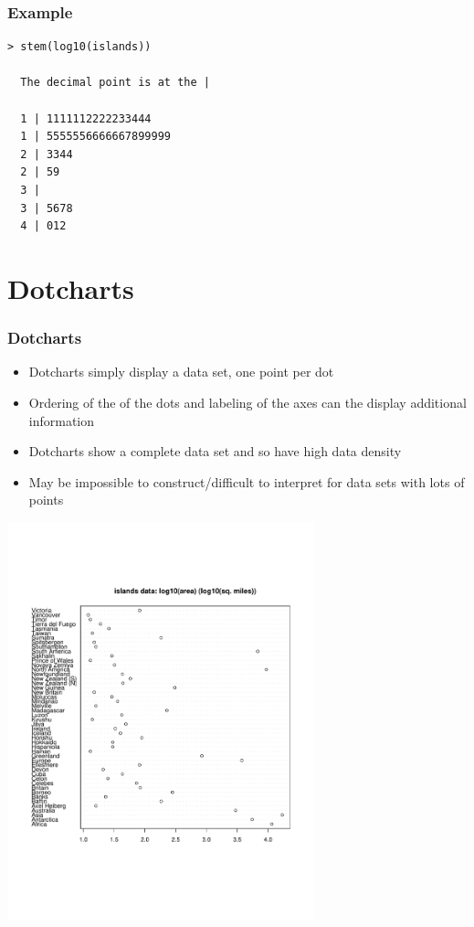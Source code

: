 \documentclass[aspectratio=169]{beamer}
\begin{document}
\begin{frame}[fragile]\frametitle{Example}
\begin{verbatim}
> stem(log10(islands))

  The decimal point is at the |

  1 | 1111112222233444
  1 | 5555556666667899999
  2 | 3344
  2 | 59
  3 | 
  3 | 5678
  4 | 012
\end{verbatim}
\end{frame}

\section{Dotcharts}
\begin{frame}\frametitle{Dotcharts}
\begin{itemize}
\item Dotcharts simply display a data set, one point per dot
\item Ordering of the of the dots and labeling of the axes
  can the display additional information
\item Dotcharts show a complete data set and so have high
  data density
\item May be impossible to construct/difficult to interpret
  for data sets with lots of points
\end{itemize}
\end{frame}

\begin{frame}
\includegraphics[width=3.5in]{dotChart.pdf}
\end{frame}
\end{document}
